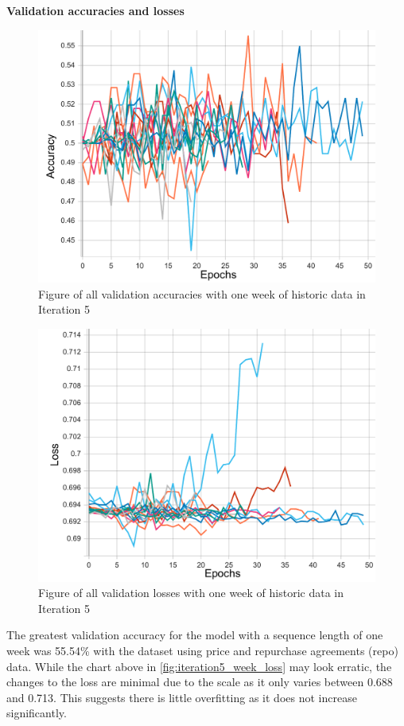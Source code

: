 \pagebreak
\textbf{Validation accuracies and losses}
\begin{figure}[ht]
    \centering
    \includegraphics[width=0.575\columnwidth]{figures/results/final/week_acc.pdf}
    \caption[Validation accuracies for Iteration 5 with one week of historic data]{Figure of all validation accuracies with one week of historic data in Iteration 5}
    \label{fig:iteration5_week_accuracy}
\end{figure}

\FloatBarrier
\begin{figure}[ht]
    \centering
    \includegraphics[width=0.575\columnwidth]{figures/results/final/week_loss.pdf}
    \caption[Validation losses for Iteration 5 with one week of historic data]{Figure of all validation losses with one week of historic data in Iteration 5}
    \label{fig:iteration5_week_loss}
\end{figure}
\FloatBarrier

The greatest validation accuracy for the model with a sequence length of one week was 55.54\% with the dataset using price and repurchase
agreements (repo) data.
While the chart above in \autoref{fig:iteration5_week_loss} may look erratic, the changes to the loss are minimal due to the scale as it only varies
between 0.688 and 0.713. This suggests there is little overfitting as it does not increase significantly.

